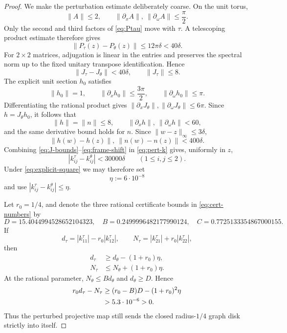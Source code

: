 \documentclass[11pt]{amsart}
\theoremstyle{remark}
\begin{document}
\begin{proof}
We make the perturbation estimate deliberately coarse.  On the unit torus,
\begin{equation}\label{eq:A-norms}
 \|A\|\le2,
 \qquad
 \|\partial_xA\|,\ \|\partial_\omega A\|\le\frac\pi2.
\end{equation}
Only the second and third factors of \eqref{eq:Ptau} move with $\tau$.
A telescoping product estimate therefore gives
\begin{equation}\label{eq:P-pert}
 \|P_\tau(z)-P_\theta(z)\|
 \le12\pi\delta<40\delta.
\end{equation}
For $2\times2$ matrices, adjugation is linear in the entries and preserves
the spectral norm up to the fixed unitary transpose identification.  Hence
\begin{equation}\label{eq:J-bounds}
 \|J_\tau-J_\theta\|<40\delta,
 \qquad
 \|J_\tau\|\le8.
\end{equation}
The explicit unit section $h_0$ satisfies
\[
 \|h_0\|=1,
 \qquad
 \|\partial_xh_0\|\le\frac{3\pi}{2},
 \qquad
 \|\partial_\omega h_0\|\le\pi.
\]
Differentiating the rational product gives
$\|\partial_xJ_\theta\|,\|\partial_\omega J_\theta\|\le6\pi$.  Since
$h=J_\theta h_0$, it follows that
\begin{equation}\label{eq:h-bounds}
 \|h\|=\|n\|\le8,
 \qquad
 \|\partial_xh\|,\ \|\partial_\omega h\|<60,
\end{equation}
and the same derivative bound holds for $n$.  Since
$\|w-z\|_\infty\le3\delta$,
\begin{equation}\label{eq:frame-shift}
 \|h(w)-h(z)\|,\ \|n(w)-n(z)\|<400\delta.
\end{equation}
Combining \eqref{eq:J-bounds}--\eqref{eq:frame-shift} in
\eqref{eq:pert-k} gives, uniformly in $z$,
\begin{equation}\label{eq:k-perturbation}
 |k_{ij}^\tau-k_{ij}^\theta|<30000\delta
 \qquad(1\le i,j\le2).
\end{equation}
Under \eqref{eq:explicit-square} we may therefore set
\[
 \eta:=6\cdot10^{-8}
\]
and use $|k_{ij}^\tau-k_{ij}^\theta|\le\eta$.

Let $r_0=1/4$, and denote the three rational certificate bounds in
\eqref{eq:cert-numbers} by
\[
 D=15.4044994528652104323,
 \quad B=0.2499996482177990124,
 \quad C=0.7725133354867000155.
\]
If
\[
 d_\tau=|k_{11}^\tau|-r_0|k_{12}^\tau|,
 \qquad
 N_\tau=|k_{21}^\tau|+r_0|k_{22}^\tau|,
\]
then
\begin{align*}
 d_\tau&\ge d_\theta-(1+r_0)\eta,\\
 N_\tau&\le N_\theta+(1+r_0)\eta.
\end{align*}
At the rational parameter,
$N_\theta\le B d_\theta$ and $d_\theta\ge D$.  Hence
\begin{align}\label{eq:image-margin}
 r_0d_\tau-N_\tau
 &\ge (r_0-B)D-(1+r_0)^2\eta\\
 &>5.3\cdot10^{-6}>0.\notag
\end{align}
Thus the perturbed projective map still sends the closed radius-$1/4$ graph
disk strictly into itself.


\end{proof}
\end{document}
